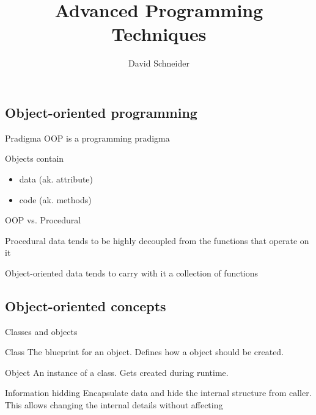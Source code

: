 \documentclass{beamer}
\title{Advanced Programming Techniques}
\author{David Schneider}
\begin{document}
\frame{\titlepage}


\subsection{Object-oriented programming}

\begin{frame}{Pradigma}
OOP is a programming pradigma

Objects contain
\begin{itemize}
\item data (ak. attribute)
\item code (ak. methods)
\end{itemize}

\end{frame}

\begin{frame}{OOP vs. Procedural}

\begin{block}{Procedural}
data tends to be highly decoupled from the functions that operate on it
\end{block}

\begin{block}{Object-oriented}
data tends to carry with it a collection of functions
\end{block}


\end{frame}

\subsection{Object-oriented concepts}

\begin{frame}{Classes and objects}

\begin{block}{Class}
The blueprint for an object. Defines how a object should be created.
\end{block}

\begin{block}{Object}
An instance of a class. Gets created during runtime.
\end{block}

\end{frame}

\begin{frame}{Information hidding}
Encapsulate data and hide the internal structure from caller. This allows
changing the internal details without affecting 
\end{frame}
\end{document}
